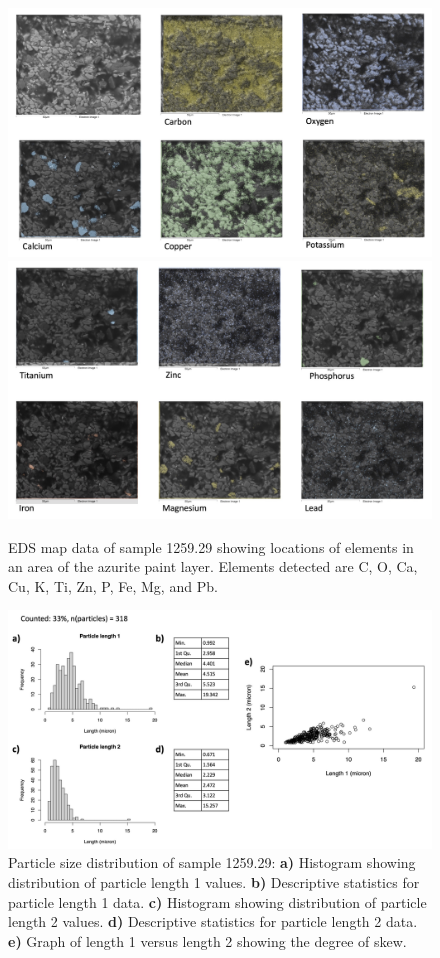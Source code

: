 \begin{figure}[H]
\centering
\begin{minipage}[t]{\linewidth}
  \centering
  \includegraphics[width=0.9\linewidth]{1259.29_mapdata_1}
\hfill
\includegraphics[width=0.9\linewidth]{1259.29_mapdata_2}
\hfill
\end{minipage}
\caption[EDS map data, sample 1259.29.]{EDS map data of sample 1259.29 showing locations of elements in an area of the azurite paint layer. Elements detected are C, O, Ca, Cu, K, Ti, Zn, P, Fe, Mg, and Pb.}
\label{fig:1259.29_mapdata}
\end{figure}


\begin{figure}[H]
\centering
  \includegraphics[width=0.8\linewidth]{1259.29_partsize}
\caption[Particle size distribution, sample 1259.29.]{Particle size distribution of sample 1259.29: \textbf{a)} Histogram showing distribution of particle length 1 values. \textbf{b)} Descriptive statistics for particle length 1 data. \textbf{c)} Histogram showing distribution of particle length 2 values. \textbf{d)} Descriptive statistics for particle length 2 data. \textbf{e)} Graph of length 1 versus length 2 showing the degree of skew.}
\label{fig:1259.29_partsize}
\end{figure}


